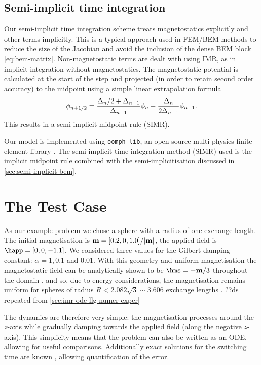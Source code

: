\documentclass[10pt, final, conference, transmag]{IEEEtran}
\begin{document}
\subsection{Semi-implicit time integration}
\iftransmagpaper
Our semi-implicit time integration scheme treats magnetostatics explicitly and other terms implicitly.
This is a typical approach used in FEM/BEM methods to reduce the size of the Jacobian and avoid the inclusion of the dense BEM block \eqref{eq:bem-matrix}.
Non-magnetostatic terms are dealt with using IMR, as in implicit integration without magnetostatics.
The magnetostatic potential is calculated at the start of the step and projected (in order to retain second order accuracy) to the midpoint using a simple linear extrapolation formula
\begin{equation}
  \label{eq:hms-midpoint}
  \phi_{n+1/2} = \frac{\Delta_{n}/2 + \Delta_{n-1}}{\Delta_{n-1}}\phi_n - \frac{\Delta_{n}}{2\Delta_{n-1}}\phi_{n-1}.
\end{equation}
This results in a semi-implicit midpoint rule (SIMR).

\vspace{3pt}

Our model is implemented using \texttt{oomph-lib}, an open source multi-physics finite-element library \cite{oomph-lib-website-dummy} \cite{github-micromagnetics}.
\else
The semi-implicit time integration method (SIMR) used is the implicit midpoint rule combined with the semi-implicitisation discussed in \autoref{sec:semi-implicit-bem}.
\fi


\section{The Test Case}

As our example problem we chose a sphere with a radius of one exchange length.
The initial magnetisation is $\mathbf{m} = [0.2, 0, 1.0]/|\mathbf{m}|$, the applied field is $\happ =[0, 0, -1.1]$. 
We considered three values for the Gilbert damping constant: $\alpha = 1, 0.1$ and $0.01$.
With this geometry and uniform magnetisation the magnetostatic field can be analytically shown to be $\hms = -\mv/3$ throughout the domain \cite[112]{Aharoni1996}, and so, due to energy considerations, the magnetisation remains uniform for spheres of radius $R < 2.082 \sqrt{3} \sim 3.606$ exchange lengths \cite[211]{HubertSchafer}.
\ifthesis
??ds repeated from \autoref{sec:imr-ode-llg-numer-exper}
\fi

The dynamics are therefore very simple: the magnetisation processes around the $z$-axis while gradually damping towards the applied field (along the negative $z$-axis).
This simplicity means that the problem can also be written as an ODE, allowing for useful comparisons.
Additionally exact solutions for the switching time are known \cite{Mallinson2000}, allowing quantification of the error.
\end{document}
